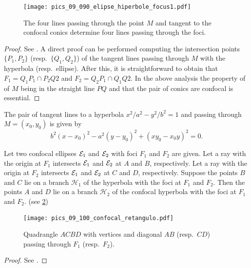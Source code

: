\begin{figure}
	\begin{center}
 	 \texttt{[image: pics\_09\_090\_elipse\_hiperbole\_focus1.pdf]}
		\caption{The four lines passing through the point $M$ and tangent to the confocal conics determine four lines passing through the foci. \label{fig:ehfocus}}
	\end{center}
\end{figure}
\begin{proof}
See \cite{dolgirev2014}. A direct proof can be performed computing the intersection points $\{P_1,P_2\}$ (resp.\ $\{Q_1,Q_2\}$) of the tangent lines passing through $M$ with the hyperbola (resp.\ ellipse). After this, it is straightforward to obtain that $F_1= Q_1P_1\cap P_2Q2$
and $F_2= Q_2P_1\cap Q_1Q2$. 
In the above analysis the property of of $M$ being in the straight line $PQ$ and that the pair of conics are confocal is essential.
\end{proof}
\begin{remark}
The pair of tangent lines to a hyperbola $x^2/a^2-y^2/b^2=1$ and passing through $M=(x_0,y_0)$ is given by
\[ b^2(x - x_0)^2 -a^2(y - y_0)^2  + (xy_0 - x_0y)^2=0.
\]
\end{remark}

 \begin{theorem}\label{th:dolgirev}
 Let two confocal ellipses $\mathcal{E}_1$ and $\mathcal{E}_2$   with foci $F_1 $ and $F_2$ are given. Let a
 ray with the origin at $F_1$ intersects $\mathcal{E}_1$ and $\mathcal{E}_2$ at $A$ and $B$, respectively. Let a ray with
 the origin at $F_2$ intersects $\mathcal{E}_1$ and $\mathcal{E}_2$ at $C$ and $D$, respectively. Suppose the points $B$ and
 $C$ lie on a branch $\mathcal{H}_1$   of the hyperbola with the foci at $F_1$ and $F_2$.
 Then the points $A$
 and $D$ lie on a branch $\mathcal{H}_2$ of the confocal hyperbola with the foci at $F_1$ and $F_2$. (see \cref{fig:retangulo_EH})

 \end{theorem}

 \begin{figure} 
 	\begin{center}
 	 \texttt{[image: pics\_09\_100\_confocal\_retangulo.pdf]}
 		\caption {Quadrangle $ACBD$ with vertices and diagonal  $AB$ (resp.\ $CD$) passing through $F_1$ (resp.\   $F_2$).
 		 \label{fig:retangulo_EH} }
 	\end{center}

 \end{figure}

 \begin{proof}
 See \cite{dolgirev2014}.
\end{proof}

 